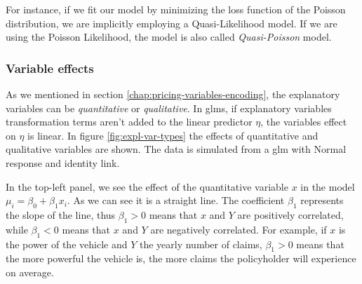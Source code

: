 \documentclass[a4paper, twoside, openright, 12pt]{report}
\let\origfigure\figure
\let\endorigfigure\endfigure
\renewenvironment{figure}[1][2] {
  \expandafter\origfigure\expandafter[!hbtp]
} {
  \endorigfigure
}
\theoremstyle{definition}
\theoremstyle{definition}
\theoremstyle{definition}
\theoremstyle{remark}
\begin{document}
For instance, if we fit our model by minimizing the loss function of the Poisson distribution, we are implicitly employing a Quasi-Likelihood model. If we are using the Poisson Likelihood, the model is also called \emph{Quasi-Poisson} model.

\hypertarget{chap:var-effects}{%
\subsubsection{Variable effects}\label{chap:var-effects}}

As we mentioned in section \ref{chap:pricing-variables-encoding}, the explanatory variables can be \emph{quantitative} or \emph{qualitative}. In \ac{glm}s, if explanatory variables transformation terms aren't added to the linear predictor \(\eta\), the variables effect on \(\eta\) is linear. In figure \ref{fig:expl-var-types} the effects of quantitative and qualitative variables are shown. The data is simulated from a \ac{glm} with Normal response and identity link.





\begin{figure}[!hbtp]

{\centering {}\newline{}

}

\caption{Explanatory variables types.}\label{fig:expl-var-types}
\end{figure}

In the top-left panel, we see the effect of the quantitative variable \(x\) in the model \(\mu_i = \beta_0 + \beta_1 x_i\). As we can see it is a straight line. The coefficient \(\beta_1\) represents the slope of the line, thus \(\beta_1>0\) means that \(x\) and \(Y\) are positively correlated, while \(\beta_1<0\) means that \(x\) and \(Y\) are negatively correlated. For example, if \(x\) is the power of the vehicle and \(Y\) the yearly number of claims, \(\beta_1>0\) means that the more powerful the vehicle is, the more claims the policyholder will experience on average.
\end{document}
